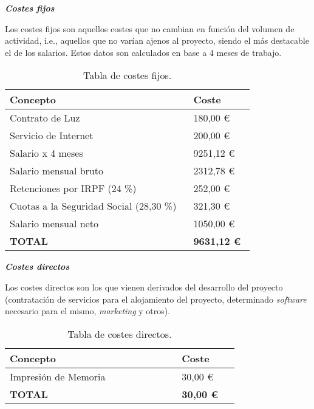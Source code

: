 \textbf{\textit{Costes fijos}}

Los costes fijos son aquellos costes que no cambian en función del volumen de actividad, i.e., aquellos que no varían ajenos al proyecto, siendo el más destacable el de los salarios. Estos datos son calculados en base a 4 meses de trabajo.

\begin{table}[H]
	\centering
	\begin{tabular}{>{\raggedright}b{0.6\linewidth}>{\raggedleft\arraybackslash}b{0.2\linewidth}}
		\toprule
		\textbf{{Concepto}}  & \textbf{{Coste}} \\
		\midrule
		\small{\; Contrato de Luz} & \small{180,00 €} \\		
		\midrule
		\small{\; Servicio de Internet} & \small{200,00 €} \\		
		\midrule
		\small{\; Salario x 4 meses} & \small{9251,12 €} \\
		\cline{2-2}
		\scriptsize{\qquad Salario mensual bruto} & \scriptsize{2312,78 €} \\
		\scriptsize{\qquad Retenciones por IRPF (24 \%)} & \scriptsize{252,00 €} \\
		\scriptsize{\qquad Cuotas a la Seguridad Social (28,30 \%)} & \scriptsize{321,30 €} \\
		\scriptsize{\qquad Salario mensual neto} & \scriptsize{1050,00 €} \\
		\bottomrule
		\textbf{{\scriptsize TOTAL}}  & \textbf{\small 9631,12 €} \\
		\bottomrule
	\end{tabular}
	\caption{Tabla de costes fijos.}
\end{table}

\textbf{\textit{Costes directos}}

Los costes directos son los que vienen derivados del desarrollo del proyecto (contratación de servicios para el alojamiento del proyecto, determinado \textit{software} necesario para el mismo, \textit{marketing} y otros).

\begin{table}[H]
	\centering
	\begin{tabular}{>{\raggedright}b{0.6\linewidth}>{\raggedleft\arraybackslash}b{0.2\linewidth}}
		\toprule
		\textbf{{Concepto}}  & \textbf{{Coste}} \\
		\midrule
		\small{\scriptsize Impresión de Memoria} & \small{30,00 €} \\
		\bottomrule
		\textbf{{\scriptsize TOTAL}}  & \textbf{\small 30,00 €} \\
		\bottomrule
	\end{tabular}
	\caption{Tabla de costes directos.}
\end{table}

